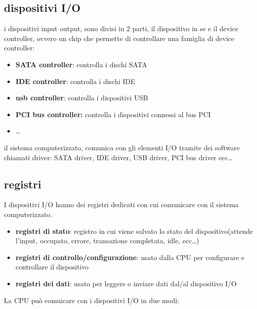 \documentclass{article}
\begin{document}
    \subsection{dispositivi I/O}
        i dispositivi input output, sono divisi in 2 parti, il dispositivo in se e il device controller, ovvero un chip che permette di controllare una famiglia di device controller:

        \begin{itemize}
            \item \textbf{SATA controller}:
            controlla i dischi SATA
            
            \item \textbf{IDE controller}:
            controlla i dischi IDE
            
            \item \textbf{usb controller}:
            controlla i dispositivi USB
            
            \item \textbf{PCI bus controller:} controlla i dispositivi connessi al bus PCI
            \item \ldots
        \end{itemize}
        il sistema computerizzato, comunica con gli elementi I/O tramite dei software chiamati driver: SATA driver, IDE driver, USB driver, PCI bus driver ecc\ldots

        \subsection{registri}
         I dispositivi I/O hanno dei registri dedicati con cui comunicare con il sistema computerizzato.

        \begin{itemize}
            \item \textbf{registri di stato}:
            registro in cui viene salvato lo stato del dispositivo(attende l'input, occupato, errore, transazione completata, idle, ecc\ldots)

            \item \textbf{registri di controllo/configurazione}:
            usato dalla CPU per configurare e controllare il dispositivo

            \item \textbf{registri dei dati}:
            usato per leggere o inviare dati dal/al dispositivo I/O
        \end{itemize}
        La CPU può comuicare con i dispositivi I/O in due modi:
        
\end{document}
